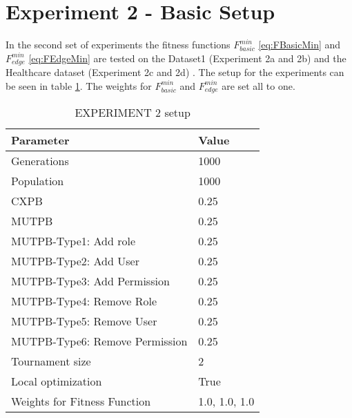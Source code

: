 \section{Experiment 2 - Basic Setup}
\label{sec:exp2}
In the second set of experiments the fitness functions $F_{basic}^{min}$ \eqref{eq:FBasicMin} and $F_{edge}^{min}$ \eqref{eq:FEdgeMin} are tested on the Dataset1 (Experiment 2a and 2b) and the Healthcare dataset (Experiment 2c and 2d) . The setup for the experiments can be seen in table \ref{tab:exp2_setup}. The weights for $F_{basic}^{min}$ and $F_{edge}^{min}$ are set all to one.

\begin{table}[H]
    \centering
    \begin{adjustbox}{width=0.5\textwidth}
	    \begin{tabular}{|l|l|}
	        \hline
	        \rowcolor{myGray} 
	        \textbf{Parameter}              & \textbf{Value}    \\ \hline
	        Generations                     & 1000              \\ \hline
	        Population                      & 1000              \\ \hline
	        CXPB                            & 0.25              \\ \hline
	        MUTPB                           & 0.25              \\ \hline
	        MUTPB-Type1: Add role           & 0.25              \\ \hline
	        MUTPB-Type2: Add User           & 0.25              \\ \hline
	        MUTPB-Type3: Add Permission     & 0.25              \\ \hline
	        MUTPB-Type4: Remove Role        & 0.25              \\ \hline
	        MUTPB-Type5: Remove User        & 0.25              \\ \hline
	        MUTPB-Type6: Remove Permission  & 0.25              \\ \hline
	        Tournament size                 & 2                 \\ \hline
	        Local optimization              & True              \\ \hline
	        Weights for Fitness Function    & 1.0, 1.0, 1.0     \\ \hline
	    \end{tabular}
	\end{adjustbox}
    \caption{EXPERIMENT 2 setup}
    \label{tab:exp2_setup}
\end{table}

